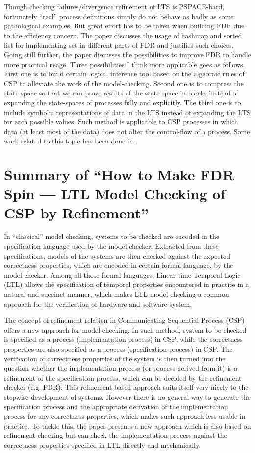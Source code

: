 \documentclass{llncs}
\begin{document}
Though checking failures/divergence refinement of LTS is PSPACE-hard,
fortunately ``real'' process definitions simply do not behave as badly as some
pathological examples. But great effort has to be taken when building FDR due 
to the efficiency concern. The paper discusses the usage of hashmap and sorted
list for implementing set in different parts of FDR and justifies such choices.
Going still further, the paper discusses the possibilities to improve
FDR to handle more practical usage. Three possibilities I think more applicable
goes as follows. First one is to build certain
logical inference tool based on the algebraic rules of CSP to alleviate the work
of the model-checking. Second one is to compress the state-space so
that we can prove results of the state space in blocks instead of expanding the
state-spaces of processes fully and explicitly. The third one is to include
symbolic representations of data in the LTS instead of expanding the LTS for each
possible values. Such method is applicable to CSP processes in which data (at
least most of the data) does not alter the control-flow of a process. Some work 
related to this topic has been done in \cite{Lazic1999Semantic}.

\newpage 
\section{Summary of ``How to Make FDR Spin --- LTL Model Checking of CSP by
Refinement''\cite{Leuschel2001How}}
  \label{section:FDRSPIN}

In ``classical'' model checking, systems to be checked are encoded in the
specification language used by the model checker. Extracted from these
specifications, models of the systems are then checked against the expected
correctness properties, which are encoded in certain formal language, by the
model checker. Among all those formal languages, Linear-time Temporal Logic 
(LTL) allows the specification of temporal properties encountered in practice
 in a natural and succinct manner, which makes LTL model checking a common
approach for the verification of hardware and software system.

The concept of refinement relation in Communicating Sequential Process (CSP)
offers a new approach for model checking. In such method, system to be checked is
specified as a process (implementation process) in CSP, while the correctness 
properties are also specified as a process (specification process) in CSP. The
verification of correctness properties of the system is then turned into the
question whether the implementation process (or process derived from it) is a
refinement of the
specification process, which can be decided by the refinement checker (e.g.
FDR). This refinement-based approach suits itself very nicely to the stepwise
development of systems. However there is no general way to
generate the specification process and the appropriate derivation of the
implementation process for any correctness properties, which makes such approach
less usable in practice. To tackle this, the paper presents a new approach which is also based
on refinement checking but can check the implementation process against the
correctness properties specified in LTL directly and mechanically. 
\end{document}
